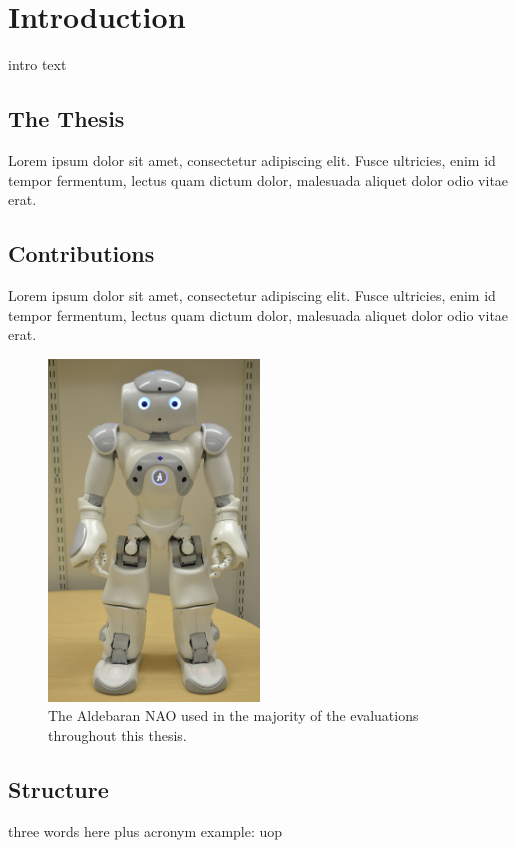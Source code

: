 \chapter{Introduction}
intro text \cite{kennedy2016social}

\section{The Thesis}\label{sec:intro-thesis}
Lorem ipsum dolor sit amet, consectetur adipiscing elit. Fusce ultricies, enim id tempor fermentum, lectus quam dictum dolor, malesuada aliquet dolor odio vitae erat. 

\section{Contributions}\label{sec:intro-contr}
Lorem ipsum dolor sit amet, consectetur adipiscing elit. Fusce ultricies, enim id tempor fermentum, lectus quam dictum dolor, malesuada aliquet dolor odio vitae erat. 

\begin{figure}[ht]
    \centering
    \includegraphics[width=0.5\textwidth]{images/ch3_nao.jpg}
    \caption{The Aldebaran NAO used in the majority of the evaluations throughout this thesis.}
    \label{fig:ch3_nao}
\end{figure}

\section{Structure}\label{sec:intro-struct}
three words here plus acronym example: \acrshort{uop}